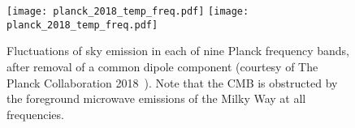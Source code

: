 \begin{figure}[htpb]
\centering\capstart{}
\texttt{[image: planck\_2018\_temp\_freq.pdf]}
\texttt{[image: planck\_2018\_temp\_freq.pdf]}
\caption[
The 2018 Planck maps in intensity in each frequency band
]{
Fluctuations of sky emission in each of nine Planck frequency bands, after removal of a common dipole component (courtesy of The Planck Collaboration 2018~\cite{Planck2020}).
Note that the CMB is obstructed by the foreground microwave emissions of the Milky Way at all frequencies.
}\label{fig:chapter2_planck_frequency}
\end{figure}
